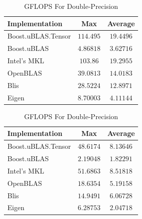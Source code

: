 \begin{table}[ht]
    \centering
    \caption{GFLOPS For Single-Precision}
    \begin{tabular}{|l|c|c|}
        \hline
        \textbf{Implementation} & \textbf{Max} & \textbf{Average}\\
        \hline
        Boost.uBLAS.Tensor  & $114.495$& $19.4496$ \\
        \hline
        Boost.uBLAS         & $4.86818$& $3.62716$ \\
        \hline
        Intel's MKL         & $103.86$& $19.2955$ \\
        \hline
        OpenBLAS            & $39.0813$& $14.0183$ \\
        \hline
        Blis                & $28.5224$& $12.8971$ \\
        \hline
        Eigen               & $8.70003$& $4.11144$ \\
        \hline
    \end{tabular}

    \vspace*{1 cm}

    \centering
    \caption{GFLOPS For Double-Precision}
    \begin{tabular}{|l|c|c|}
        \hline
        \textbf{Implementation} & \textbf{Max} & \textbf{Average}\\
        \hline
        Boost.uBLAS.Tensor  & $48.6174$& $8.13646$ \\
        \hline
        Boost.uBLAS         & $2.19048$& $1.82291$ \\
        \hline
        Intel's MKL         & $51.6863$& $8.51818$ \\
        \hline
        OpenBLAS            & $18.6354$& $5.19158$ \\
        \hline
        Blis                & $14.9491$& $6.06728$ \\
        \hline
        Eigen               & $6.28753$& $2.04718$ \\
        \hline
    \end{tabular}
\end{table}

